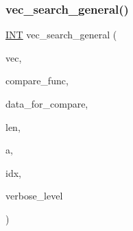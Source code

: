 \subsubsection{\texorpdfstring{vec\+\_\+search\+\_\+general()}{vec\_search\_general()}}
{\footnotesize\ttfamily \mbox{\hyperlink{galois_8h_a09fddde158a3a20bd2dcadb609de11dc}{I\+NT}} vec\+\_\+search\+\_\+general (\begin{DoxyParamCaption}\item[{void $\ast$}]{vec,  }\item[{\mbox{\hyperlink{galois_8h_a09fddde158a3a20bd2dcadb609de11dc}{I\+NT}}($\ast$)(void $\ast$vec, void $\ast$a, \mbox{\hyperlink{galois_8h_a09fddde158a3a20bd2dcadb609de11dc}{I\+NT}} \mbox{\hyperlink{alphabet2_8_c_a148e3876077787926724625411d6e7a9}{b}}, void $\ast$data\+\_\+for\+\_\+compare)}]{compare\+\_\+func,  }\item[{void $\ast$}]{data\+\_\+for\+\_\+compare,  }\item[{\mbox{\hyperlink{galois_8h_a09fddde158a3a20bd2dcadb609de11dc}{I\+NT}}}]{len,  }\item[{void $\ast$}]{a,  }\item[{\mbox{\hyperlink{galois_8h_a09fddde158a3a20bd2dcadb609de11dc}{I\+NT}} \&}]{idx,  }\item[{\mbox{\hyperlink{galois_8h_a09fddde158a3a20bd2dcadb609de11dc}{I\+NT}}}]{verbose\+\_\+level }\end{DoxyParamCaption})}

